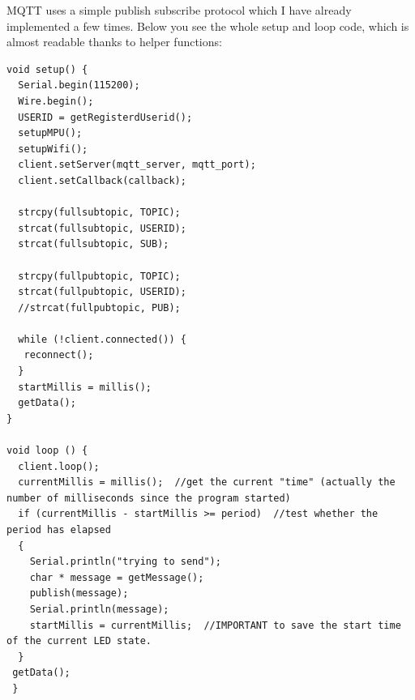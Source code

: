MQTT uses a simple publish subscribe protocol which I have already implemented a few times.
Below you see the whole setup and loop code, which is almost readable thanks to helper functions:
\begin{lstlisting}
void setup() {
  Serial.begin(115200);
  Wire.begin();
  USERID = getRegisterdUserid();
  setupMPU();
  setupWifi();
  client.setServer(mqtt_server, mqtt_port);
  client.setCallback(callback);

  strcpy(fullsubtopic, TOPIC); 
  strcat(fullsubtopic, USERID);
  strcat(fullsubtopic, SUB);
  
  strcpy(fullpubtopic, TOPIC); 
  strcat(fullpubtopic, USERID);
  //strcat(fullpubtopic, PUB);
  
  while (!client.connected()) {
   reconnect();
  }
  startMillis = millis(); 
  getData();
}

void loop () {
  client.loop();
  currentMillis = millis();  //get the current "time" (actually the number of milliseconds since the program started)
  if (currentMillis - startMillis >= period)  //test whether the period has elapsed
  {
    Serial.println("trying to send");
    char * message = getMessage();
    publish(message);
    Serial.println(message);
    startMillis = currentMillis;  //IMPORTANT to save the start time of the current LED state.
  }
 getData();
 }
\end{lstlisting}

